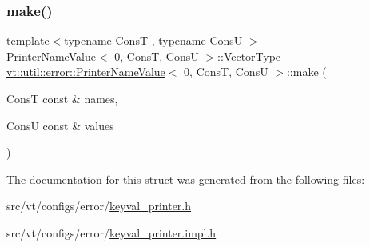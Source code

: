 \subsubsection{\texorpdfstring{make()}{make()}}
{\footnotesize\ttfamily template$<$typename ConsT , typename ConsU $>$ \\
\hyperlink{structvt_1_1util_1_1error_1_1_printer_name_value}{Printer\+Name\+Value}$<$ 0, ConsT, ConsU $>$\+::\hyperlink{structvt_1_1util_1_1error_1_1_printer_name_value_3_010_00_01_cons_t_00_01_cons_u_01_4_a1578540c95029bb5f6a8345efe655486}{Vector\+Type} \hyperlink{structvt_1_1util_1_1error_1_1_printer_name_value}{vt\+::util\+::error\+::\+Printer\+Name\+Value}$<$ 0, ConsT, ConsU $>$\+::make (\begin{DoxyParamCaption}\item[{ConsT const \&}]{names,  }\item[{ConsU const \&}]{values }\end{DoxyParamCaption})\hspace{0.3cm}{\ttfamily [static]}}



The documentation for this struct was generated from the following files\+:\begin{DoxyCompactItemize}
\item 
src/vt/configs/error/\hyperlink{keyval__printer_8h}{keyval\+\_\+printer.\+h}\item 
src/vt/configs/error/\hyperlink{keyval__printer_8impl_8h}{keyval\+\_\+printer.\+impl.\+h}\end{DoxyCompactItemize}
